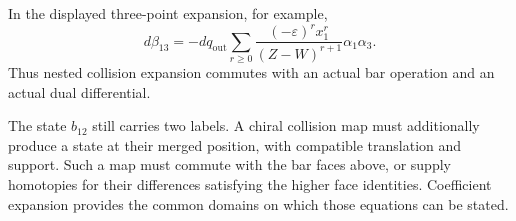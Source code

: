 In the displayed three-point expansion, for example,
\[
 d\beta_{13}
 =-dq_{\mathrm{out}}\sum_{r\ge0}
 \frac{(-\varepsilon)^r x_1^r}{(Z-W)^{r+1}}
 \alpha_1\alpha_3.
\]
Thus nested collision expansion commutes with an actual bar
operation and an actual dual differential.

The state $b_{12}$ still carries two labels.
A chiral collision map must additionally produce a state at their
merged position, with compatible translation and support.
Such a map must commute with the bar faces above, or supply
homotopies for their differences satisfying the higher face
identities. Coefficient expansion provides the common domains on
which those equations can be stated.
